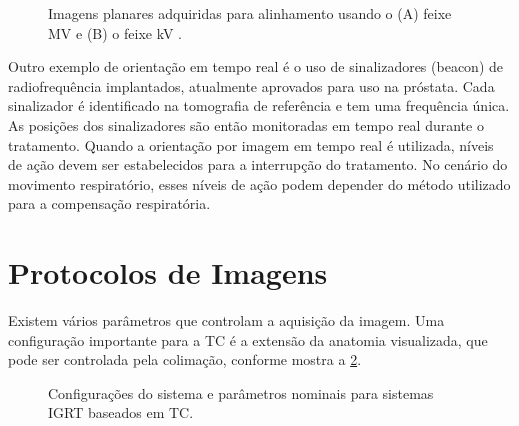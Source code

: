 \documentclass[11pt,a4paper]{article}
\newcounter{exemplo}
\begin{document}
	\begin{figure}[!h]
		\centering
		\caption{Imagens planares adquiridas para alinhamento usando o (A) feixe MV e (B) o feixe kV .}
		\label{fig:protocoloImagemPlanar}
	\end{figure}

	Outro exemplo de orientação em tempo real é o uso de sinalizadores (beacon) de radiofrequência implantados, atualmente aprovados para uso na próstata. Cada sinalizador é identificado na tomografia de referência e tem uma frequência única. As posições dos sinalizadores são então monitoradas em tempo real durante o tratamento. Quando a orientação por imagem em tempo real é utilizada, níveis de ação devem ser estabelecidos para a interrupção do tratamento. No cenário do movimento respiratório, esses níveis de ação podem depender do método utilizado para a compensação respiratória.

\section{Protocolos de Imagens}

	Existem vários parâmetros que controlam a aquisição da imagem. Uma configuração importante para a TC é a extensão da anatomia visualizada, que pode ser controlada pela colimação, conforme mostra a \ref{fig:parametrosIgrtTc}.

	\begin{figure}[h]
		\centering
		\caption{Configurações do sistema e parâmetros nominais para sistemas IGRT baseados em TC.}
		\label{fig:parametrosIgrtTc}
	\end{figure}
\end{document}
